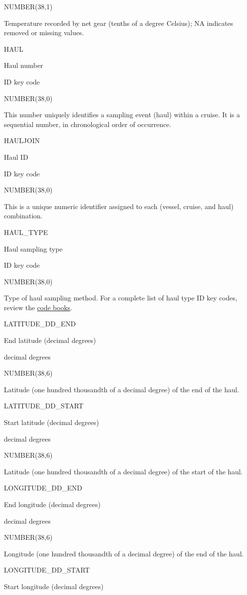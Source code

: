 \documentclass[
  letterpaper,
  oneside,
  open=any]{scrbook}
\begin{document}
NUMBER(38,1)

Temperature recorded by net gear (tenths of a degree Celsius); NA
indicates removed or missing values.

HAUL

Haul number

ID key code

NUMBER(38,0)

This number uniquely identifies a sampling event (haul) within a cruise.
It is a sequential number, in chronological order of occurrence.

HAULJOIN

Haul ID

ID key code

NUMBER(38,0)

This is a unique numeric identifier assigned to each (vessel, cruise,
and haul) combination.

HAUL\_TYPE

Haul sampling type

ID key code

NUMBER(38,0)

Type of haul sampling method. For a complete list of haul type ID key
codes, review the
\href{https://www.fisheries.noaa.gov/resource/document/groundfish-survey-species-code-manual-and-data-codes-manual}{code
books}.

LATITUDE\_DD\_END

End latitude (decimal degrees)

decimal degrees

NUMBER(38,6)

Latitude (one hundred thousandth of a decimal degree) of the end of the
haul.

LATITUDE\_DD\_START

Start latitude (decimal degrees)

decimal degrees

NUMBER(38,6)

Latitude (one hundred thousandth of a decimal degree) of the start of
the haul.

LONGITUDE\_DD\_END

End longitude (decimal degrees)

decimal degrees

NUMBER(38,6)

Longitude (one hundred thousandth of a decimal degree) of the end of the
haul.

LONGITUDE\_DD\_START

Start longitude (decimal degrees)
\end{document}
